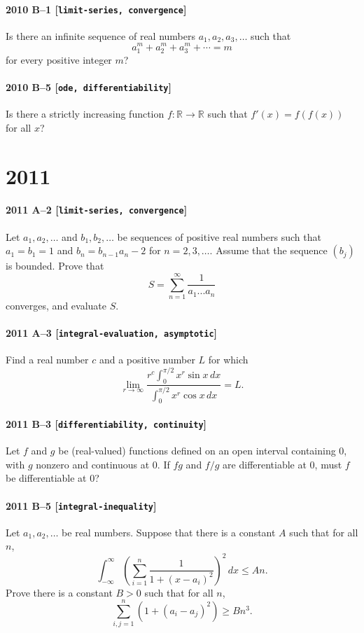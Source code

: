 \documentclass[11pt]{article}
\begin{document}
\paragraph{2010 B--1 \textnormal{[\texttt{limit-series, convergence}]}}
Is there an infinite sequence of real numbers $a_1, a_2, a_3, \dots$ such that
\[
a_1^m + a_2^m + a_3^m + \cdots = m
\]
for every positive integer $m$?

\paragraph{2010 B--5 \textnormal{[\texttt{ode, differentiability}]}}
Is there a strictly increasing function $f: \mathbb{R} \to \mathbb{R}$ such that $f'(x) = f(f(x))$ for all $x$?

\section*{2011}

\paragraph{2011 A--2 \textnormal{[\texttt{limit-series, convergence}]}}
Let $a_1,a_2,\dots$ and $b_1,b_2,\dots$ be sequences of positive
real numbers such that $a_1 = b_1 = 1$ and $b_n = b_{n-1} a_n - 2$ for
$n=2,3,\dots$. Assume that the sequence $(b_j)$ is bounded. Prove that
\[
S = \sum_{n=1}^\infty \frac{1}{a_1...a_n}
\]
converges, and evaluate $S$.

\paragraph{2011 A--3 \textnormal{[\texttt{integral-evaluation, asymptotic}]}}
Find a real number $c$ and a positive number $L$ for which
\[
\lim_{r\to\infty} \frac{r^c \int_0^{\pi/2} x^r \sin x \,dx}{\int_0^{\pi/2} x^r \cos x \,dx} = L.
\]

\paragraph{2011 B--3 \textnormal{[\texttt{differentiability, continuity}]}}
Let $f$ and $g$ be (real-valued) functions defined on an open
interval containing $0$, with $g$ nonzero and continuous at $0$. If $fg$
and $f/g$ are differentiable at $0$, must $f$ be differentiable at 0?

\paragraph{2011 B--5 \textnormal{[\texttt{integral-inequality}]}}
Let $a_1, a_2, \dots$ be real numbers. Suppose that there is
a constant $A$ such that for all $n$,
\[
\int_{-\infty}^\infty \left( \sum_{i=1}^n \frac{1}{1 + (x-a_i)^2} \right)^2\,dx \leq An.
\]
Prove there is a constant $B>0$ such that for all $n$,
\[
\sum_{i,j=1}^n (1 + (a_i - a_j)^2) \geq Bn^3.
\]
\end{document}
